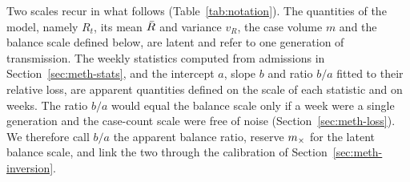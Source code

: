 Two scales recur in what follows (Table~\ref{tab:notation}). The quantities of the model, namely $R_t$, its mean $\bar{R}$ and variance $v_R$, the case volume $m$ and the balance scale defined below, are latent and refer to one generation of transmission. The weekly statistics computed from admissions in Section~\ref{sec:meth-stats}, and the intercept $a$, slope $b$ and ratio $b/a$ fitted to their relative loss, are apparent quantities defined on the scale of each statistic and on weeks. The ratio $b/a$ would equal the balance scale only if a week were a single generation and the case-count scale were free of noise (Section~\ref{sec:meth-loss}). We therefore call $b/a$ the apparent balance ratio, reserve $m_{\times}$ for the latent balance scale, and link the two through the calibration of Section~\ref{sec:meth-inversion}.


